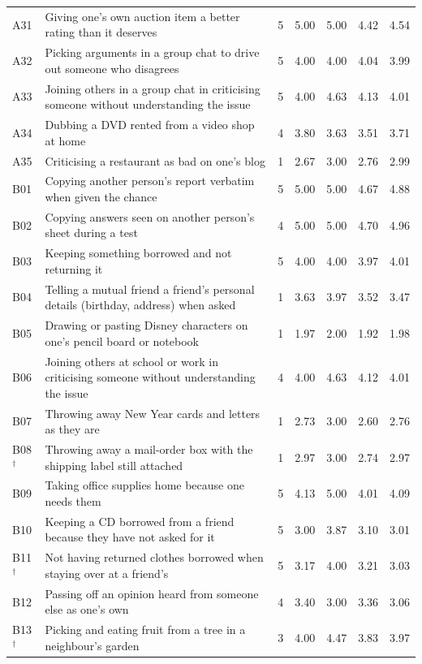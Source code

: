 \begin{longtable}{@{}l>{\raggedright\arraybackslash}p{}rrrrr@{}}
A31 & Giving one's own auction item a better rating than it deserves & 5 & 5.00 & 5.00 & 4.42 & 4.54 \\
A32 & Picking arguments in a group chat to drive out someone who disagrees & 5 & 4.00 & 4.00 & 4.04 & 3.99 \\
A33 & Joining others in a group chat in criticising someone without understanding the issue & 5 & 4.00 & 4.63 & 4.13 & 4.01 \\
A34 & Dubbing a DVD rented from a video shop at home & 4 & 3.80 & 3.63 & 3.51 & 3.71 \\
A35 & Criticising a restaurant as bad on one's blog & 1 & 2.67 & 3.00 & 2.76 & 2.99 \\
B01 & Copying another person's report verbatim when given the chance & 5 & 5.00 & 5.00 & 4.67 & 4.88 \\
B02 & Copying answers seen on another person's sheet during a test & 4 & 5.00 & 5.00 & 4.70 & 4.96 \\
B03 & Keeping something borrowed and not returning it & 5 & 4.00 & 4.00 & 3.97 & 4.01 \\
B04 & Telling a mutual friend a friend's personal details (birthday, address) when asked & 1 & 3.63 & 3.97 & 3.52 & 3.47 \\
B05 & Drawing or pasting Disney characters on one's pencil board or notebook & 1 & 1.97 & 2.00 & 1.92 & 1.98 \\
B06 & Joining others at school or work in criticising someone without understanding the issue & 4 & 4.00 & 4.63 & 4.12 & 4.01 \\
B07 & Throwing away New Year cards and letters as they are & 1 & 2.73 & 3.00 & 2.60 & 2.76 \\
B08$^\dagger$ & Throwing away a mail-order box with the shipping label still attached & 1 & 2.97 & 3.00 & 2.74 & 2.97 \\
B09 & Taking office supplies home because one needs them & 5 & 4.13 & 5.00 & 4.01 & 4.09 \\
B10 & Keeping a CD borrowed from a friend because they have not asked for it & 5 & 3.00 & 3.87 & 3.10 & 3.01 \\
B11$^\dagger$ & Not having returned clothes borrowed when staying over at a friend's & 5 & 3.17 & 4.00 & 3.21 & 3.03 \\
B12 & Passing off an opinion heard from someone else as one's own & 4 & 3.40 & 3.00 & 3.36 & 3.06 \\
B13$^\dagger$ & Picking and eating fruit from a tree in a neighbour's garden & 3 & 4.00 & 4.47 & 3.83 & 3.97 \\

\end{longtable}

